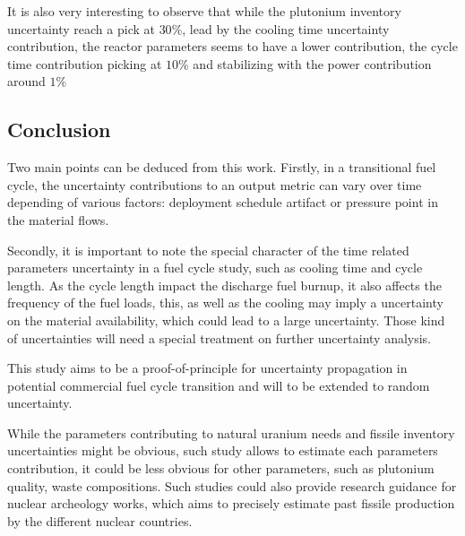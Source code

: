 \documentclass{anstrans}
\begin{document}
It is also very interesting to observe that while the plutonium inventory uncertainty
reach a pick at $30\%$, lead by the cooling time uncertainty contribution, the reactor
parameters seems to have a lower contribution, the cycle time contribution
picking at $10\%$ and stabilizing with the power contribution around $1\%$


\subsection{Conclusion}

Two main points can be deduced from this work. Firstly, in a transitional
fuel cycle, the uncertainty contributions to an output metric can vary over time
depending of various factors: deployment schedule artifact or pressure point in
the material flows.

Secondly, it is important to note the special character of the time related
parameters uncertainty in a fuel cycle study, such as cooling time and cycle
length. As the cycle length impact the discharge fuel burnup, it also affects
the frequency of the fuel loads, this, as well as the cooling may imply a
uncertainty on the material availability, which could lead to a large
uncertainty. Those kind of uncertainties will need a special treatment on further
uncertainty analysis.

This study aims to be a proof-of-principle for uncertainty propagation in
potential commercial fuel cycle transition and will to be extended to random
uncertainty.

While the parameters contributing to natural uranium needs and fissile inventory
uncertainties might be obvious, such study allows to estimate each parameters
contribution, it could be less obvious for other parameters, such as
plutonium quality, waste compositions. Such studies could also provide research
guidance for nuclear archeology works, which aims to precisely estimate past
fissile production by the different nuclear countries.
\end{document}
